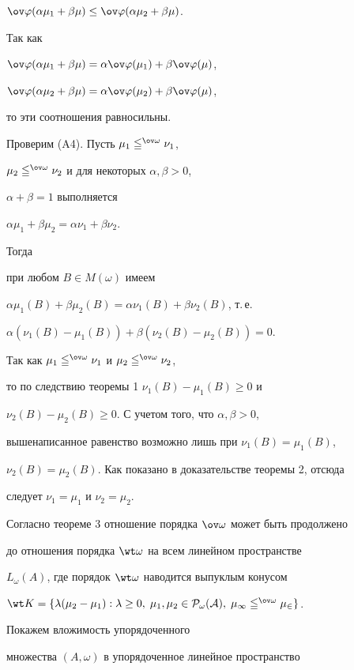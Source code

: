 \begin{pf}
$\ov\varphi(\alpha\mu_1+\beta\mu)\le\ov\varphi(\alpha\mu_2+\beta\mu)$. 


Так как 


$\ov\varphi(\alpha\mu_1+\beta\mu)=\alpha\ov\varphi(\mu_1)+ 


\beta\ov\varphi(\mu)$, 


$\ov\varphi(\alpha\mu_2+\beta\mu)=\alpha\ov\varphi(\mu_2)+ 


\beta\ov\varphi(\mu)$, 


то эти соотношения равносильны. 


Проверим (A4). Пусть $\mu_1\leqq^{\ov\omega}\nu_1$, 


$\mu_2\leqq^{\ov\omega}\nu_2$ и для некоторых $\alpha,\beta>0$, 


$\alpha+\beta=1$ выполняется 


$\alpha\mu_1+\beta\mu_2=\alpha\nu_1+\beta\nu_2$. 


Тогда 


при любом $B\in M(\omega)$ имеем 


$\alpha\mu_1(B)+\beta\mu_2(B)=\alpha\nu_1(B)+\beta\nu_2(B)$, т.\,е. 


$\alpha(\nu_1(B)-\mu_1(B))+\beta(\nu_2(B)-\mu_2(B))=0$. 


Так как $\mu_1\leqq^{\ov\omega}\nu_1$ и $\mu_2\leqq^{\ov\omega}\nu_2$, 


то по следствию теоремы 1\; $\nu_1(B)-\mu_1(B)\ge 0$ и 


$\nu_2(B)-\mu_2(B)\ge 0$. С учетом того, что $\alpha,\beta>0$, 


вышенаписанное равенство возможно лишь при $\nu_1(B)=\mu_1(B)$, 


$\nu_2(B)=\mu_2(B)$. Как показано в доказательстве теоремы 2, отсюда 


следует $\nu_1=\mu_1$ и $\nu_2=\mu_2$. 


 


Согласно теореме 3 отношение порядка $\ov\omega$ может быть продолжено 


до отношения порядка $\wt\omega$ на всем линейном пространстве 


$L_\omega(A)$, где порядок $\wt\omega$ наводится выпуклым конусом 


$\wt K=\{\lambda(\mu_2-\mu_1):\lambda\ge 0,\; \mu_1,\mu_2\in\cal 


P_\omega(A),\;\mu_1\leqq^{\ov\omega}\mu_2\}$. 


Покажем вложимость упорядоченного 


множества $(A,\omega)$ в упорядоченное линейное пространство 



\end{pf}
